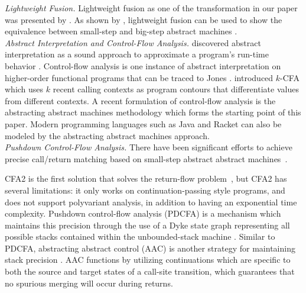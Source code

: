 \documentclass[acmsmall, screen]{acmart}\settopmatter{}
\begin{document}
\textit{Lightweight Fusion.}
Lightweight fusion as one of the transformation in our paper was presented by
\citeauthor{Ohori:2007:LFF:1190216.1190241} \cite{Ohori:2007:LFF:1190216.1190241}.
As shown by \citeauthor{DANVY2008100}, lightweight fusion can be used to show the
equivalence between small-step and big-step abstract machines \cite{DANVY2008100}.\\

\textit{Abstract Interpretation and Control-Flow Analysis.}
\citeauthor{cousot1977abstract} discovered abstract interpretation as a sound approach to
approximate a program's run-time behavior \cite{cousot1977abstract}. Control-flow analysis
is one instance of abstract interpretation on higher-order functional programs that can be traced to
Jones \cite{jones1981flow}. 
introduced $k$-CFA which uses $k$ recent calling contexts as program contours that
differentiate values from different contexts.
A recent formulation of control-flow analysis is the abstracting abstract machines
methodology \cite{van2012systematic, van2010abstracting} which forms the starting point
of this paper. Modern programming languages such as Java \cite{might2010resolving} and
Racket \cite{Tobin-Hochstadt:2012:HSE:2384616.2384655} can also be modeled by the abstracting
abstract machines approach. \\

\textit{Pushdown Control-Flow Analysis.}
There have been significant efforts to achieve precise call/return matching
based on small-step abstract abstract machines~\cite{vardoulakis2010cfa2, earl2012introspective,
gilray2016pushdown, johnson2015abstracting}.

CFA2 is the first solution that solves the return-flow problem~\cite{vardoulakis2010cfa2},
but CFA2 has several limitations: it only works on continuation-passing style programs, and
does not support polyvariant analysis, in addition to having an exponential time complexity.
Pushdown control-flow analysis (PDCFA) is a mechanism which maintains this precision through
the use of a Dyke state graph representing all possible stacks contained within the unbounded-stack
machine \cite{earl2012introspective, earl2010pushdown}. Similar to PDCFA, abstracting abstract
control (AAC) is another strategy for maintaining stack precision \cite{johnson2015abstracting}.
AAC functions by utilizing continuations which are specific to both the source and target states
of a call-site transition, which guarantees that no spurious merging will occur during returns.
\end{document}
